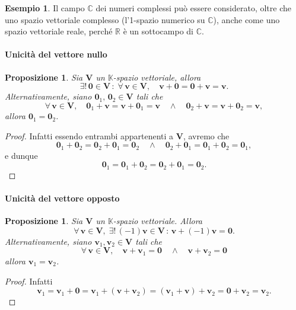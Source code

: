 \documentclass{article}
\theoremstyle{plain}
\newtheorem{prop}[thm]{Proposizione}
\theoremstyle{definition}
\newtheorem{exmp}{Esempio}[section]
\theoremstyle{remark}
\begin{document}
\vspace{10pt}

\begin{exmp}
    Il campo \( \mathbb{C} \) dei numeri complessi può essere considerato, oltre che uno spazio vettoriale complesso (l'1-spazio numerico su \( \mathbb{C} \)), anche come uno spazio vettoriale reale, perché \( \mathbb{R} \) è un sottocampo di \( \mathbb{C} \).
\end{exmp}

\vspace{10pt}

\paragraph{Unicità del vettore nullo}
\begin{bxthm}
\begin{prop}
    Sia \( \mathbf{V} \) un $\mathbb{K}$-spazio vettoriale, allora 
    \[\exists!\,\mathbf{0}\in\mathbf{V}\,:\;\forall\,\mathbf{v}\in\mathbf{V},\quad \mathbf{v}+\mathbf{0}=\mathbf{0}+\mathbf{v}=\mathbf{v}. \]
    Alternativamente, siano $\mathbf{0}_1,\,\mathbf{0}_2\in\mathbf{V}$
    tali che
    \[ \forall\,\mathbf{v}\in\mathbf{V},\quad \mathbf{0}_1 + \mathbf{v} = \mathbf{v} + \mathbf{0}_1 = \mathbf{v}\quad\land\quad\mathbf{0}_2 + \mathbf{v} = \mathbf{v} + \mathbf{0}_2 = \mathbf{v},\]
    allora $\mathbf{0}_1=\mathbf{0}_2$.
\end{prop}
\end{bxthm}
\begin{proof}
    Infatti essendo entrambi appartenenti a $\mathbf{V}$, avremo che 
    \[ \mathbf{0}_1 + \mathbf{0}_2 = \mathbf{0}_2 + \mathbf{0}_1 = \mathbf{0}_2\quad\land\quad\mathbf{0}_2 + \mathbf{0}_1 = \mathbf{0}_1 + \mathbf{0}_2 = \mathbf{0}_1, \]
    e dunque 
    \[\mathbf{0}_1 = \mathbf{0}_1 + \mathbf{0}_2 = \mathbf{0}_2 + \mathbf{0}_1 = \mathbf{0}_2.\]
\end{proof}

\vspace{10pt}

\paragraph{Unicità del vettore opposto}
\begin{bxthm}
\begin{prop}
    Sia \( \mathbf{V} \) un $\mathbb{K}$-spazio vettoriale. Allora \[\forall\,\mathbf{v} \in \mathbf{V},\;\exists!\,(-1)\mathbf{v}\in\mathbf{V}\,:\,\mathbf{v}+(-1)\mathbf{v}=\mathbf{0}.\]
    Alternativamente, siano $\mathbf{v}_1, \mathbf{v}_2\in\mathbf{V}$ tali che 
    \[ \forall\,\mathbf{v}\in\mathbf{V},\quad \mathbf{v}+\mathbf{v}_1=\mathbf{0}\quad\land\quad\mathbf{v}+\mathbf{v}_2=\mathbf{0} \]    
    allora \(\mathbf{v}_1 = \mathbf{v}_2\).
\end{prop}
\end{bxthm}
\begin{proof}
    Infatti 
    \[\mathbf{v}_1=\mathbf{v}_1+\mathbf{0}=\mathbf{v}_1+(\mathbf{v}+\mathbf{v}_2)=(\mathbf{v}_1+\mathbf{v})+\mathbf{v}_2=\mathbf{0}+\mathbf{v}_2=\mathbf{v}_2.\]
\end{proof}
\end{document}
